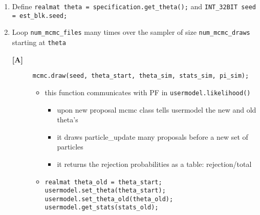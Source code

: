\documentclass[11pt, letterpaper, notitlepage]{article}
\begin{document}
\begin{enumerate}
\item  Define
\texttt{realmat theta = specification.get\_theta();} and \texttt{INT\_32BIT seed = est\_blk.seed;}

\item Loop \texttt{num\_mcmc\_files} many times over the sampler of size \texttt{num\_mcmc\_draws} starting at \texttt{theta}
\begin{description}
\item[\textbf{[A]}] \texttt{mcmc.draw(seed, theta\_start, theta\_sim, stats\_sim, pi\_sim);}
\begin{itemize}
\item this function communicates with PF in \texttt{usermodel.likelihood()}
\begin{itemize}
\item upon new proposal mcmc class tells usermodel the new and old theta's
\item it draws particle\_update many proposals before a new set of particles
\item it returns the rejection probabilities as a table: rejection/total
\end{itemize}
\item \texttt{realmat theta\_old = theta\_start;} \\

    \texttt{usermodel.set\_theta(theta\_start); \\
    usermodel.set\_theta\_old(theta\_old); \\
    usermodel.get\_stats(stats\_old);} \\
    

\end{itemize}
\end{description}
\end{enumerate}
\end{document}

